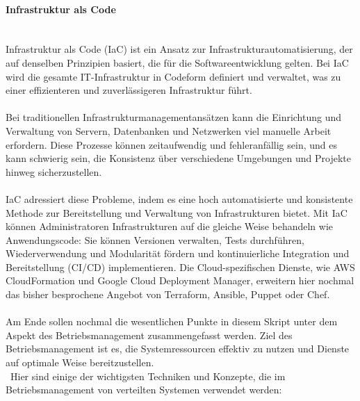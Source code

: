 \documentclass[../vs-script-first-v01.tex]{subfiles}
\begin{document}
\paragraph{Infrastruktur als Code \\\\}
Infrastruktur als Code (IaC) ist ein Ansatz zur Infrastrukturautomatisierung, der auf denselben Prinzipien basiert, die für die Softwareentwicklung gelten. Bei IaC wird die gesamte IT-Infrastruktur in Codeform definiert und verwaltet, was zu einer effizienteren und zuverlässigeren Infrastruktur führt.
\\\\
Bei traditionellen Infrastrukturmanagementansätzen kann die Einrichtung und Verwaltung von Servern, Datenbanken und Netzwerken viel manuelle Arbeit erfordern. Diese Prozesse können zeitaufwendig und fehleranfällig sein, und es kann schwierig sein, die Konsistenz über verschiedene Umgebungen und Projekte hinweg sicherzustellen.
\\\\
IaC adressiert diese Probleme, indem es eine hoch automatisierte und konsistente Methode zur Bereitstellung und Verwaltung von Infrastrukturen bietet. Mit IaC können Administratoren Infrastrukturen auf die gleiche Weise behandeln wie Anwendungscode: Sie können Versionen verwalten, Tests durchführen, Wiederverwendung und Modularität fördern und kontinuierliche Integration und Bereitstellung (CI/CD) implementieren.
Die Cloud-spezifischen Dienste, wie AWS CloudFormation und Google Cloud Deployment Manager, erweitern hier nochmal das bisher besprochene Angebot von Terraform, Ansible, Puppet oder Chef.
\\\\ 
Am Ende sollen nochmal die wesentlichen Punkte in diesem Skript unter dem Aspekt des Betriebsmanagement zusammengefasst werden. Ziel des Betriebsmanagement ist es, die Systemressourcen effektiv zu nutzen und Dienste auf optimale Weise bereitzustellen.
\\\
Hier sind einige der wichtigsten Techniken und Konzepte, die im Betriebsmanagement von verteilten Systemen verwendet werden:
\end{document}
